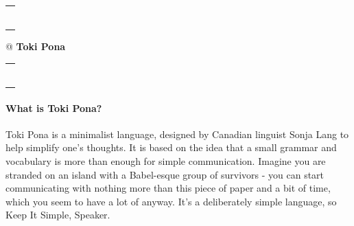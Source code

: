 \documentclass[10pt,a4paper]{article}
\author{Andreas Hemmetter}
\begin{document}
\pagestyle{fancyplain}
\fancyhf{}
\begin{center}

\begin{tabular}[t]{@{}l}
\rule[4pt]{0.35\linewidth}{4pt}
\end{tabular}
\begin{tabular}[t]{@{}}
\fontsize{24pt}{10pt}
\textbf{Toki Pona}
\end{tabular}
\begin{tabular}[t]{r@{}}
\rule[4pt]{0.35\linewidth}{4pt}
\end{tabular}
\end{center}

\paragraph{What is Toki Pona?}
Toki Pona is a minimalist language, designed by Canadian linguist Sonja Lang to help simplify one's thoughts. It is based on the idea that a small grammar and vocabulary is more than enough for simple communication. Imagine you are stranded on an island with a Babel-esque group of survivors - you can start communicating with nothing more than this piece of paper and a bit of time, which you seem to have a lot of anyway. It's a deliberately simple language, so Keep It Simple, Speaker.
\end{document}
